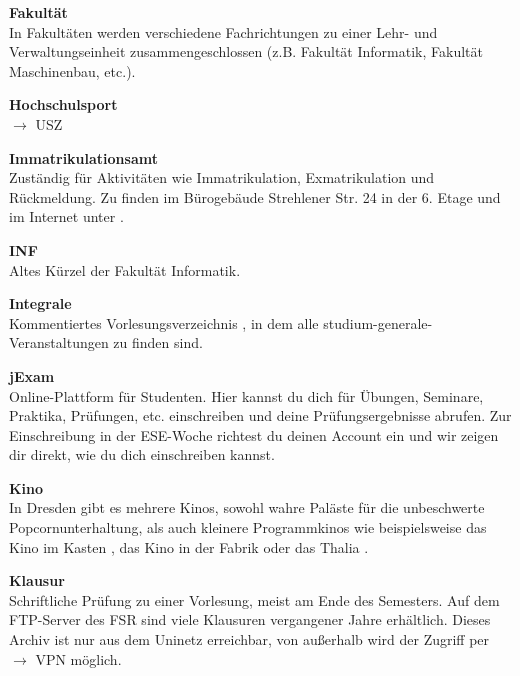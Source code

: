 \begin{multicols}{2}
\textbf{Fakultät} \\
In Fakultäten werden verschiedene Fachrichtungen zu einer Lehr- und Verwaltungseinheit zusammengeschlossen (z.B. Fakultät Informatik, Fakultät Maschinenbau, etc.).


\textbf{Hochschulsport} \\
$\rightarrow$ USZ

\textbf{Immatrikulationsamt} \\
Zuständig für Aktivitäten wie Immatrikulation, Exmatrikulation und Rückmeldung.
Zu finden im Bürogebäude Strehlener Str. 24 in der 6. Etage und im Internet unter .

\textbf{INF} \\
Altes Kürzel der Fakultät Informatik.

\textbf{Integrale} \\
Kommentiertes Vorlesungsverzeichnis , in dem alle studium-generale-Veranstaltungen zu finden sind. 

\textbf{jExam} \\
Online-Plattform für Studenten.
Hier kannst du dich für Übungen, Seminare, Praktika, Prüfungen, etc. einschreiben und deine Prüfungsergebnisse abrufen.
Zur Einschreibung in der ESE-Woche richtest du deinen Account ein und wir zeigen dir direkt, wie du dich einschreiben kannst. 

\textbf{Kino} \\
In Dresden gibt es mehrere Kinos, sowohl wahre Paläste für die unbeschwerte Popcornunterhaltung, als auch kleinere Programmkinos wie beispielsweise das Kino im Kasten , das Kino in der Fabrik  oder das Thalia .

\textbf{Klausur} \\
Schriftliche Prüfung zu einer Vorlesung, meist am Ende des Semesters.
Auf dem FTP-Server des FSR  sind viele Klausuren vergangener Jahre erhältlich. Dieses Archiv ist nur aus dem Uninetz erreichbar, von außerhalb wird der Zugriff per $\rightarrow$ VPN möglich.


\end{multicols}

